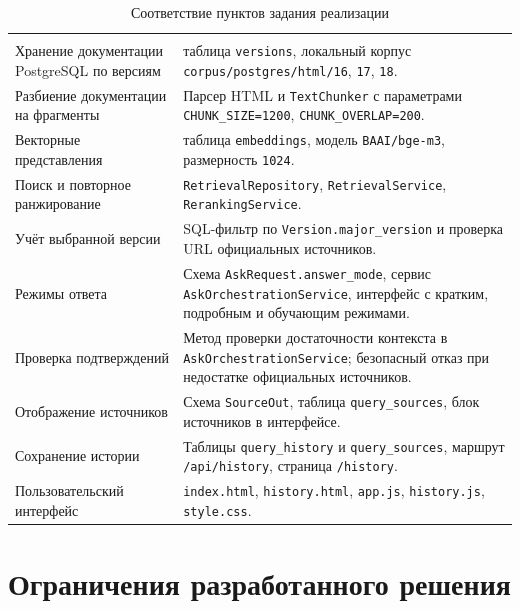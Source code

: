 \begingroup
\centering
\small
{}\selectfont
\setlength{\tabcolsep}{4pt}
\begin{longtable}{|P{0.36\textwidth}|P{0.52\textwidth}|}
\caption{Соответствие пунктов задания реализации}\label{tab:appendix-task-trace}\\
\hline
{} &  \\ \hline
\endfirsthead
{}\\
\hline
\endhead
\endfoot
Хранение документации PostgreSQL по версиям & таблица \texttt{versions}, локальный корпус \texttt{corpus/postgres/html/16}, \texttt{17}, \texttt{18}. \\ \hline
Разбиение документации на фрагменты & Парсер HTML и \texttt{TextChunker} с параметрами \texttt{CHUNK\_SIZE=1200}, \texttt{CHUNK\_OVERLAP=200}. \\ \hline
Векторные представления & таблица \texttt{embeddings}, модель \texttt{BAAI/bge-m3}, размерность \texttt{1024}. \\ \hline
Поиск и повторное ранжирование & \texttt{RetrievalRepository}, \texttt{RetrievalService}, \texttt{RerankingService}. \\ \hline
Учёт выбранной версии & SQL-фильтр по \texttt{Version.major\_version} и проверка URL официальных источников. \\ \hline
Режимы ответа & Схема \texttt{AskRequest.answer\_mode}, сервис \texttt{AskOrchestrationService}, интерфейс с кратким, подробным и обучающим режимами. \\ \hline
Проверка подтверждений & Метод проверки достаточности контекста в \texttt{AskOrchestrationService}; безопасный отказ при недостатке официальных источников. \\ \hline
Отображение источников & Схема \texttt{SourceOut}, таблица \texttt{query\_sources}, блок источников в интерфейсе. \\ \hline
Сохранение истории & Таблицы \texttt{query\_history} и \texttt{query\_sources}, маршрут \texttt{/api/history}, страница \texttt{/history}. \\ \hline
Пользовательский интерфейс & \texttt{index.html}, \texttt{history.html}, \texttt{app.js}, \texttt{history.js}, \texttt{style.css}. \\ \hline
\end{longtable}
\par\endgroup

\section{Ограничения разработанного решения}

